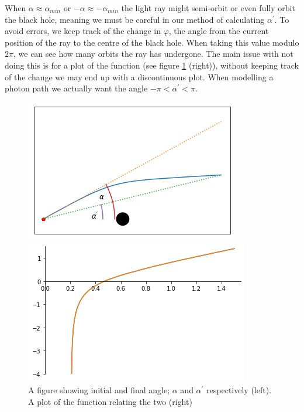 \documentclass[oneside,openright,frontopenright, singlespacing]{dmathesis}
\begin{document}
\vspace{1em}
	When $\alpha \approx \alpha_{min}$ or $-\alpha \approx -\alpha_{min}$ the light ray might semi-orbit or even fully orbit the black hole, meaning we must be careful in our method of calculating $\alpha^{'}$. To avoid errors, we keep track of the change in $\varphi$, the angle from the current position of the ray to the centre of the black hole. When taking this value modulo $2\pi$, we can see how many orbits the ray has undergone. The main issue with not doing this is for a plot of the function (see figure \ref{fig:Figure3.3} (right)), without keeping track of the change we may end up with a discontinuous plot. When modelling a photon path we actually want the angle $-\pi<\alpha^{'}<\pi$.

\begin{figure}[!ht]
	\centering
	\begin{minipage}{0.5\textwidth}
		\centering
		\includegraphics[height=0.5\linewidth]{img/alpha_alpha-prime}
	\end{minipage}%
	\hfill
	\begin{minipage}{0.5\textwidth}
		\centering
		\includegraphics[height=0.5\linewidth]{img/alpha-prime_f(alpha)}
	\end{minipage}
	\caption{A figure showing initial and final angle;  $\alpha$ and $\alpha^{'}$ respectively (left). A plot of the function relating the two (right)}
	\label{fig:Figure3.3}
\end{figure}
\end{document}
